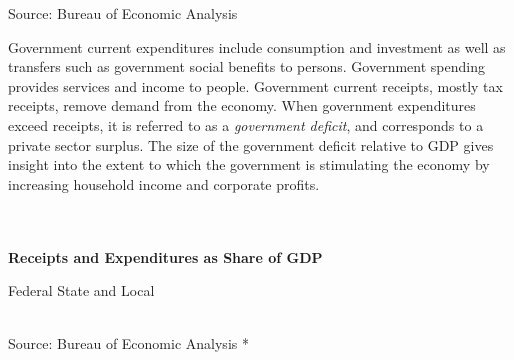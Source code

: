 \documentclass{report}
\newcommand{\tbllink}[1]{\href{https://raw.githubusercontent.com/bdecon/US-chartbook/master/chartbook/data/#1}{\faTable}}
\newcommand{\dateaxisticks}{
		date coordinates in=x, axis line style={draw=none},
		xmax={2020-05-10},
		max space between ticks=40,	    
		xtick={{1990-01-01}, {1992-01-01}, {1994-01-01}, 
			{1996-01-01}, {1998-01-01}, {2000-01-01}, 
			{2002-01-01}, {2004-01-01}, {2006-01-01},
			{2008-01-01}, {2010-01-01}, {2012-01-01}, {2014-01-01},
		    {2016-01-01}, {2018-01-01}, {2020-01-01}},
		minor xtick={{1989-01-01}, {1991-01-01}, {1993-01-01},
			{1995-01-01}, {1997-01-01}, {1999-01-01}, 
			{2001-01-01}, {2003-01-01}, {2005-01-01}, {2007-01-01},
		    {2009-01-01}, {2011-01-01}, {2013-01-01}, {2015-01-01},
		    {2017-01-01}, {2019-01-01}},
		enlarge y limits={0.06}, enlarge x limits={0.01},
		}
\newcommand{\bbar}[2]{extra #1 ticks = {{#2}}, extra #1 tick labels = ,
		extra #1 tick style = {grid=major, grid style={thick, black!25}},}
\newcommand{\stdline}[4]{\addplot[very thick, no markers, color=#1] 
		table [x=#2, y=#3, col sep=comma] {#4};	}
\newcommand{\rbars}{
		\fill[color=black!10] (axis cs:{1990-07-01},\pgfkeysvalueof{/pgfplots/ymin}) rectangle 
			(axis cs:{1991-03-01}, \pgfkeysvalueof{/pgfplots/ymax});
		\fill[color=black!10] (axis cs:{2007-12-01},\pgfkeysvalueof{/pgfplots/ymin}) rectangle 
			(axis cs:{2009-07-01}, \pgfkeysvalueof{/pgfplots/ymax});
		\fill[color=black!10] (axis cs:{2001-03-01},\pgfkeysvalueof{/pgfplots/ymin}) rectangle 
			(axis cs:{2001-11-01}, \pgfkeysvalueof{/pgfplots/ymax});}
\begin{document}
{{{{{{{\vspace{-6mm}
\footnotesize{Source: Bureau of Economic Analysis}


\newpage

\begin{minipage}{0.76\textwidth}

\small Government current expenditures include consumption and investment as well as transfers such as government social benefits to persons. Government spending provides services and income to people. Government current receipts, mostly tax receipts, remove demand from the economy. When government expenditures exceed receipts, it is referred to as a \textit{government deficit}, and corresponds to a private sector surplus. The size of the government deficit relative to GDP gives insight into the extent to which the government is stimulating the economy by increasing household income and corporate profits.\\

 \\

 \\

\vspace{2mm}

\textbf{Receipts and Expenditures as Share of GDP}
\vspace{2mm}

\noindent \normalsize \hspace{20mm} Federal \hspace{44mm} State and Local \footnotesize 
\vspace{1mm}

\noindent \hspace*{-2mm} 
\hfill
{}
\\
\footnotesize{Source: Bureau of Economic Analysis} \hfill \tbllink{fedgdp.csv}*


\end{minipage}}}}}}}}
\end{document}
